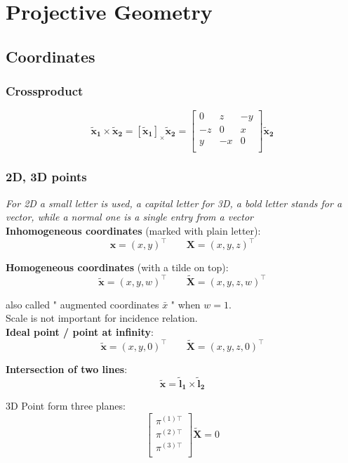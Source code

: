 \section{Projective Geometry}
\subsection{Coordinates}
\subsubsection{Crossproduct}
$$ \bm{\tilde{x}_1} \times \bm{\tilde{x}_2} = [\bm{\tilde{x}_1}]_\times \bm{\tilde{x}_2} =
\begin{bmatrix}
0&z&-y\\
-z&0&x\\
y&-x&0\\
\end{bmatrix} \bm{\tilde{x}_2} $$
\subsubsection{2D, 3D points}
\textit{For 2D a small letter is used, a capital letter for 3D, a bold letter stands for a vector, while a normal one is a single entry from a vector}\\

\textbf{Inhomogeneous coordinates} (marked with plain letter):
$$ \bm{x} = (x,y)^\top \qquad \bm{X} = (x,y,z)^\top$$

\textbf{Homogeneous coordinates} (with a tilde on top):
$$ \tilde{\bm{x}} = (x,y,w)^\top \qquad \tilde{\bm{X}} = (x,y,z,w)^\top$$

also called " augmented coordinates $\bar{x}$ " when $w = 1$.\\

Scale is not important for incidence relation.\\

\textbf{Ideal point / point at infinity}:
$$\tilde{\bm{x}} = (x,y,0)^\top \qquad \tilde{\bm{X}} = (x,y,z,0)^\top$$

\textbf{Intersection of two lines}:
$$ \tilde{\bm{x}} = \bm{\tilde{l}_1} \times \bm{\tilde{l}_2} $$

3D Point form three planes:
$$ \begin{bmatrix}
\pi^{(1)\top}\\
\pi^{(2)\top}\\
\pi^{(3)\top}\\
\end{bmatrix} \tilde{\bm{X}} = 0 $$

